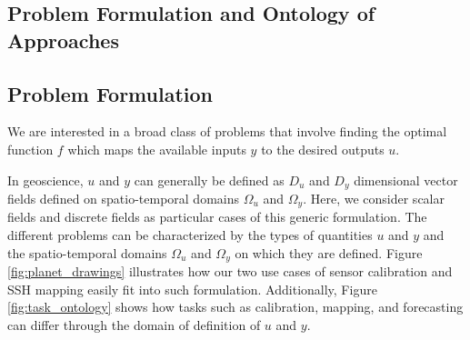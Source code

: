 \begin{bibunit}

\clearemptydoublepage
\chapter{Problem Formulation and Ontology of Approaches}
\label{chap:1}

\section{Problem Formulation}
\label{sec:chap1_problem_form}
We are interested in a broad class of problems that involve finding the optimal function $f$ which maps the available inputs $y$ to the desired outputs $u$.

In geoscience, $u$ and $y$ can generally be defined as $D_u$ and $D_y$ dimensional vector fields defined on spatio-temporal domains $\Omega_u$ and $\Omega_y$. Here, we consider scalar fields and discrete fields as particular cases of this generic formulation. The different problems can be characterized by the types of quantities $u$ and $y$ and the spatio-temporal domains $\Omega_u$ and $\Omega_y$ on which they are defined. Figure \ref{fig:planet_drawings} illustrates how our two use cases of sensor calibration and SSH mapping easily fit into such formulation. Additionally, Figure \ref{fig:task_ontology} shows how tasks such as calibration, mapping, and forecasting can differ through the domain of definition of $u$ and $y$.


\end{bibunit}
